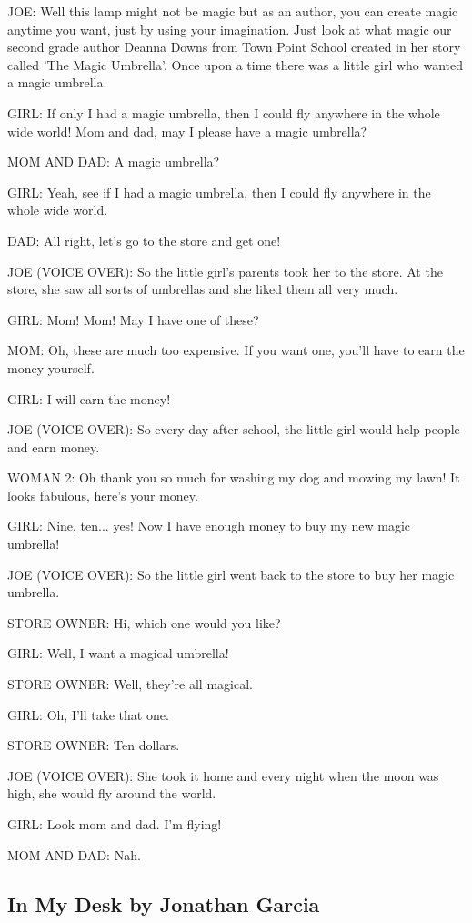JOE: Well this lamp might not be magic but as an author, you can create magic anytime you want, just by using your imagination.
Just look at what magic our second grade author Deanna Downs from Town Point School created in her story called 'The Magic Umbrella'.
Once upon a time there was a little girl who wanted a magic umbrella.

GIRL: If only I had a magic umbrella, then I could fly anywhere in the whole wide world!
Mom and dad, may I please have a magic umbrella?

MOM AND DAD: A magic umbrella?

GIRL: Yeah, see if I had a magic umbrella, then I could fly anywhere in the whole wide world.

DAD: All right, let's go to the store and get one!

JOE (VOICE OVER): So the little girl's parents took her to the store.
At the store, she saw all sorts of umbrellas and she liked them all very much.

GIRL: Mom! Mom!
May I have one of these?

MOM: Oh, these are much too expensive.
If you want one, you'll have to earn the money yourself.

GIRL: I will earn the money!

JOE (VOICE OVER): So every day after school, the little girl would help people and earn money.

WOMAN 2: Oh thank you so much for washing my dog and mowing my lawn!
It looks fabulous, here's your money.

GIRL: Nine, ten... yes!
Now I have enough money to buy my new magic umbrella!

JOE (VOICE OVER): So the little girl went back to the store to buy her magic umbrella.

STORE OWNER: Hi, which one would you like?

GIRL: Well, I want a magical umbrella!

STORE OWNER: Well, they're all magical.

GIRL: Oh, I'll take that one.

STORE OWNER: Ten dollars.

JOE (VOICE OVER): She took it home and every night when the moon was high, she would fly around the world.

GIRL: Look mom and dad.
I'm flying!

MOM AND DAD: Nah.

\subsection{In My Desk by Jonathan Garcia}

